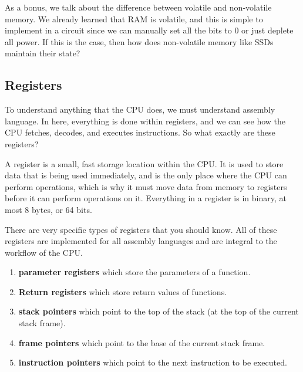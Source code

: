 \documentclass{article}
\begin{document}
    \begin{theorem}
      
    \end{theorem}

    As a bonus, we talk about the difference between volatile and non-volatile memory. We already learned that RAM is volatile, and this is simple to implement in a circuit since we can manually set all the bits to $0$ or just deplete all power. If this is the case, then how does non-volatile memory like SSDs maintain their state? 

    \begin{theorem}
      
    \end{theorem}

    \begin{theorem}
      
    \end{theorem}

  \subsection{Registers}

      To understand anything that the CPU does, we must understand assembly language. In here, everything is done within registers, and we can see how the CPU fetches, decodes, and executes instructions. So what exactly are these registers? 

      \begin{definition}[Register]
        A register is a small, fast storage location within the CPU. It is used to store data that is being used immediately, and is the only place where the CPU can perform operations, which is why it must move data from memory to registers before it can perform operations on it. Everything in a register is in binary, at most 8 bytes, or 64 bits. 

        There are very specific types of registers that you should know. All of these registers are implemented for all assembly languages and are integral to the workflow of the CPU.  
        \begin{enumerate}
          \item \textbf{parameter registers} which store the parameters of a function.
          \item \textbf{Return registers} which store return values of functions. 
          \item \textbf{stack pointers} which point to the top of the stack (at the top of the current stack frame). 
          \item \textbf{frame pointers} which point to the base of the current stack frame.
          \item \textbf{instruction pointers} which point to the next instruction to be executed.
        \end{enumerate}
      \end{definition}
\end{document}
